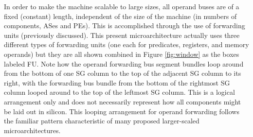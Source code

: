 \documentclass{book}
\begin{document}
In order to make the machine scalable to large sizes,
all operand buses are of a fixed (constant) length, independent of
the size of the machine (in numbers of components, ASes and PEs).
This is accomplished through the use of forwarding units (previously
discussed).  This present microarchitecture actually uses
three different types of forwarding units (one each for predicates,
registers, and memory operands) but they are all shown combined
in Figure \ref{fig:window} as the boxes labeled FU.
Note how the operand forwarding bus segment bundles loop around from
the bottom of one SG column to the top of the adjacent SG
column to its right, with the forwarding bus bundle from the 
bottom of the rightmost
SG column looped around to the top of the leftmost SG column.
This is a logical arrangement only and does not necessarily
represent how all components might be laid out in silicon.
This looping arrangement for operand forwarding follows the
familiar pattern characteristic of many proposed larger-scaled
microarchitectures. \cite{Ranganathan98}
\end{document}
